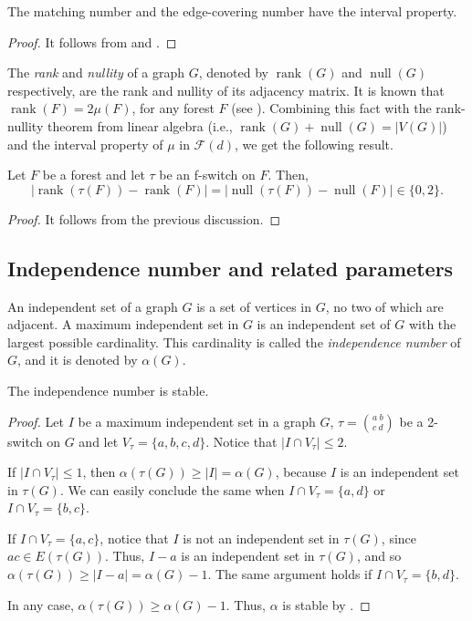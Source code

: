 \documentclass{BICA}
\newcommand{\rank}{\operatorname{rank}}
\newcommand{\mnull}{\operatorname{null}}
\begin{document}
\begin{theorem}
	The matching number and the edge-covering number have the interval property.
\end{theorem}

\begin{proof}
	It follows from  and .
\end{proof}

The \emph{rank} and \emph{nullity} of a graph $G$, denoted by $\rank(G)$ and $\mnull(G)$ respectively, are the rank and nullity of its adjacency matrix. It is known that $\rank(F)=2\mu(F)$, for any forest $F$ (see \cite{Bevis,Gutman}). Combining this fact with the rank-nullity theorem from linear algebra (i.e., $\rank(G)+\mnull(G)=|V(G)|$) and the interval property of $\mu$ in $\mathcal{F}(d)$, we get the following result.

\begin{corollary}\label{rank_null}
	Let $F$ be a forest and let \(\tau\) be an f-switch on \(F\). Then, \[|\rank(\tau(F))-\rank(F)|=|\mnull(\tau(F))-\mnull(F)|\in \{0,2\}.\]
\end{corollary}

\begin{proof}
	It follows from the previous discussion.
\end{proof}

\subsection{Independence number and related parameters}\label{sectionindependencenumber}

An independent set of a graph $G$ is a set of vertices in $G$, no two of which are adjacent. A maximum independent set in $G$ is an independent set of \(G\) with the largest possible cardinality. This cardinality is called the \emph{independence number} of $G$, and it is denoted by $\alpha(G)$.

\begin{theorem}\label{indep_stable}
	The independence number is stable.
\end{theorem}
\begin{proof}
Let $I$ be a maximum independent set in a graph $G$, $\tau={{a \ b}\choose{c \ d}}$ be a 2-switch on \(G\) and let $V_{\tau}=\{a,b,c,d\}$. Notice that $|I\cap V_{\tau}|\leq 2$.

If \(\left| I \cap  V_{\tau} \right| \leq 1\), then \(\alpha(\tau(G)) \geq |I|=\alpha(G)\),  because $I$ is an independent set in $\tau(G)$. We can easily conclude the same when $I\cap V_{\tau}=\{a,d\}$ or $I\cap V_{\tau}=\{b,c\}$.

If $I\cap V_{\tau}=\{a,c\}$, notice that $I$ is not an independent set in $\tau(G)$, since  $ac\in E(\tau(G))$. Thus, $I-a$ is an independent set in $\tau(G)$, and so $\alpha(\tau(G))\geq |I-a|=\alpha(G)-1$. The same argument holds if $I\cap V_{\tau}=\{b,d\}$.

In any case, $\alpha(\tau(G))\geq \alpha(G)-1$. Thus, $\alpha$ is stable by .
\end{proof}
\end{document}
